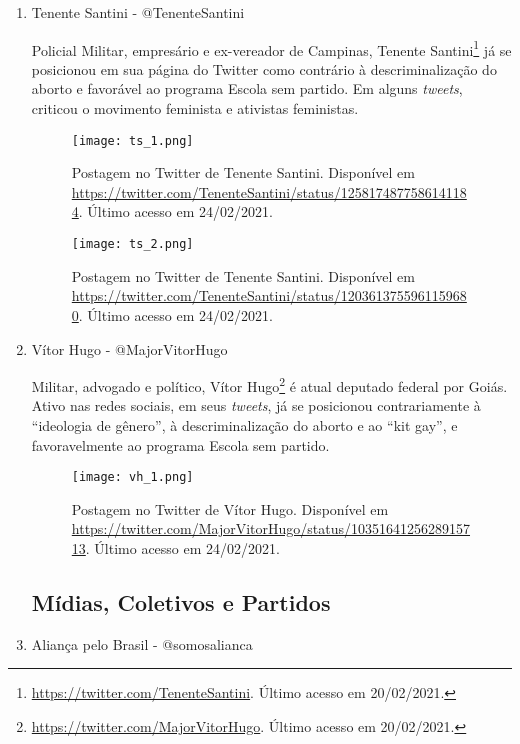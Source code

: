 \documentclass[
	12pt,				%
	openright,			%
	twoside,			%
	a4paper,			%
	english,			%
	brazil				%
	]{abntex2}
\begin{document}
\begin{anexosenv}
\begin{enumerate}
 \item Tenente Santini - @TenenteSantini
 
 Policial Militar, empresário e ex-vereador de Campinas, Tenente Santini\footnote{\url{https://twitter.com/TenenteSantini}. Último acesso em 20/02/2021.} já se posicionou em sua página do Twitter como contrário à descriminalização do aborto e favorável ao programa Escola sem partido. Em alguns \textit{tweets}, criticou o movimento feminista e ativistas feministas.
 
 \begin{figure}[!htbp]
    \centering
    \texttt{[image: ts\_1.png]}
    \caption{Postagem no Twitter de Tenente Santini. Disponível em \url{https://twitter.com/TenenteSantini/status/1258174877586141184}. Último acesso em 24/02/2021.}
 \end{figure}
 
 \begin{figure}[!htbp]
    \centering
    \texttt{[image: ts\_2.png]}
    \caption{Postagem no Twitter de Tenente Santini. Disponível em \url{https://twitter.com/TenenteSantini/status/1203613755961159680}. Último acesso em 24/02/2021.}
 \end{figure}
  
  \newpage
  
 \item Vítor Hugo - @MajorVitorHugo
 
 Militar, advogado e político, Vítor Hugo\footnote{\url{https://twitter.com/MajorVitorHugo}. Último acesso em 20/02/2021.} é atual deputado federal por Goiás. Ativo nas redes sociais, em seus \textit{tweets}, já se posicionou contrariamente à ``ideologia de gênero'', à descriminalização do aborto e ao ``kit gay'', e favoravelmente ao programa Escola sem partido.
 
 \begin{figure}[!htbp]
    \centering
    \texttt{[image: vh\_1.png]}
    \caption{Postagem no Twitter de Vítor Hugo. Disponível em \url{https://twitter.com/MajorVitorHugo/status/1035164125628915713}. Último acesso em 24/02/2021.}
 \end{figure}
 
 \newpage

 \subsection*{Mídias, Coletivos e Partidos}

 \item Aliança pelo Brasil - @somosalianca\label{alianca}
 

\end{enumerate}
\end{anexosenv}
\end{document}

